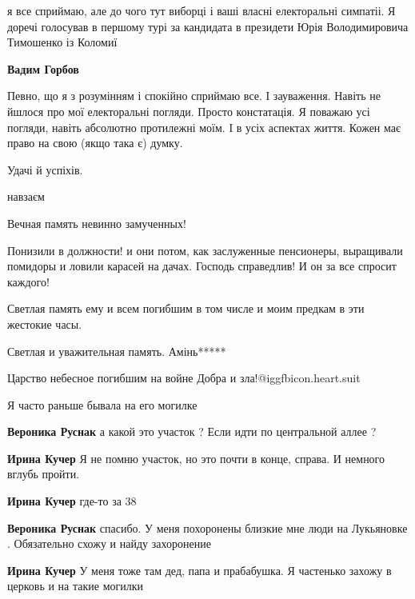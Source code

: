 \begin{itemize}
\begin{itemize}

я все сприймаю, але до чого тут виборці і ваші власні електоральні симпатіі. Я
доречі голосував в першому турі за кандидата в президети Юрія Володимировича
Тимошенко із Коломиї

\begin{itemize} %
\textbf{Вадим Горбов}

Певно, що я з розумінням і спокійно сприймаю все. І зауваження. Навіть не
йшлося про мої електоральні погляди. Просто констатація. Я поважаю усі погляди,
навіть абсолютно протилежні моїм. І в усіх аспектах життя. Кожен має право на
свою (якщо така є) думку.

Удачі й успіхів.

навзаєм
\end{itemize} %

\end{itemize} %

Вечная память невинно замученных!

Понизили в должности! и они потом, как заслуженные пенсионеры, выращивали помидоры и ловили карасей на дачах. Господь справедлив! И он за все спросит каждого!

Светлая память ему и всем погибшим в том числе и моим предкам в эти жестокие часы.

Светлая и уважительная память. Амінь*****

Царство небесное погибшим на войне Добра и зла!@igg{fbicon.heart.suit}

Я часто раньше бывала на его могилке

\begin{itemize} %
\textbf{Вероника Руснак} а какой это участок ? Если идти по центральной аллее ?

\begin{itemize} %
\textbf{Ирина Кучер} Я не помню участок, но это почти в конце, справа. И немного вглубь пройти.

\textbf{Ирина Кучер} где-то за 38

\textbf{Вероника Руснак} спасибо. У меня похоронены близкие мне люди на Лукьяновке . Обязательно схожу и найду захоронение

\textbf{Ирина Кучер} У меня тоже там дед, папа и прабабушка. Я частенько захожу в церковь и на такие могилки


\end{itemize}
\end{itemize}
\end{itemize}
